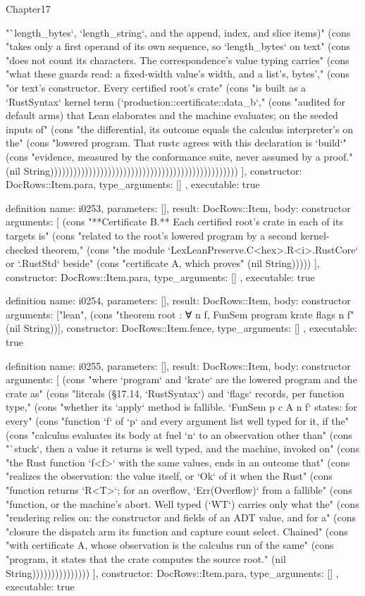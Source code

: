 \begin{lexlean}{Chapter17}
\begin{semanticmodule}
{{"`length_bytes`, `length_string`, and the append, index, and slice items)" (cons "takes only a first operand of its own sequence, so `length_bytes` on text" (cons "does not count its characters. The correspondence's value typing carries" (cons "what these guards read: a fixed-width value's width, and a list's, bytes'," (cons "or text's constructor. Every certified root's crate" (cons "is built as a `RustSyntax` kernel term (`production::certificate::data_b`," (cons "audited for default arms) that Lean elaborates and the machine evaluates; on the seeded inputs of" (cons "the differential, its outcome equals the calculus interpreter's on the" (cons "lowered program. That rustc agrees with this declaration is `build`" (cons "evidence, measured by the conformance suite, never assumed by a proof." (nil String)))))))))))))))))))))))))))))))))))))))))))))))))
    ],
    constructor: DocRows::Item.para,
    type_arguments: []
  },
  executable: true
}

definition{
  name: i0253,
  parameters: [],
  result: DocRows::Item,
  body: constructor{
    arguments: [
      (cons "**Certificate B.** Each certified root's crate in each of its targets is" (cons "related to the root's lowered program by a second kernel-checked theorem," (cons "the module `LexLeanPreserve.C<hex>.R<i>.RustCore` or `.RustStd` beside" (cons "certificate A, which proves" (nil String)))))
    ],
    constructor: DocRows::Item.para,
    type_arguments: []
  },
  executable: true
}

definition{
  name: i0254,
  parameters: [],
  result: DocRows::Item,
  body: constructor{
    arguments: ["lean", (cons "theorem root : ∀ n f, FunSem program krate flags n f" (nil String))],
    constructor: DocRows::Item.fence,
    type_arguments: []
  },
  executable: true
}

definition{
  name: i0255,
  parameters: [],
  result: DocRows::Item,
  body: constructor{
    arguments: [
      (cons "where `program` and `krate` are the lowered program and the crate as" (cons "literals (§17.14, `RustSyntax`) and `flags` records, per function type," (cons "whether its `apply` method is fallible. `FunSem p c A n f` states: for every" (cons "function `f` of `p` and every argument list well typed for it, if the" (cons "calculus evaluates its body at fuel `n` to an observation other than" (cons "`stuck`, then a value it returns is well typed, and the machine, invoked on" (cons "the Rust function `f<f>` with the same values, ends in an outcome that" (cons "realizes the observation: the value itself, or `Ok` of it when the Rust" (cons "function returns `R<T>`; for an overflow, `Err(Overflow)` from a fallible" (cons "function, or the machine's abort. Well typed (`WT`) carries only what the" (cons "rendering relies on: the constructor and fields of an ADT value, and for a" (cons "closure the dispatch arm its function and capture count select. Chained" (cons "with certificate A, whose observation is the calculus run of the same" (cons "program, it states that the crate computes the source root." (nil String)))))))))))))))
    ],
    constructor: DocRows::Item.para,
    type_arguments: []
  },
  executable: true
}


\end{semanticmodule}
\end{lexlean}
